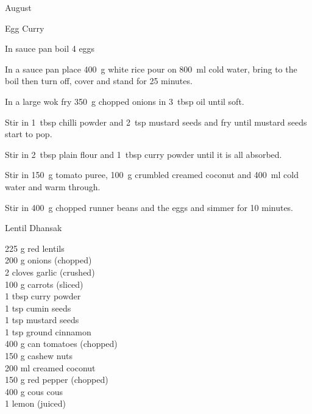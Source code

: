 \begin{menu}{August}
\begin{recipe}{2}{Egg Curry}
    \begin{instructions}
    \item 
        In sauce pan boil
        4  eggs\item 
    In a
    sauce pan
    place
    400~g  white rice
    pour on
    800~ml  cold water,
    bring to the boil then turn off, cover and stand for 25 minutes.
  \item 
        In a large wok fry
        350~g chopped onions
        in
        3~tbsp  oil
        until soft.
      \item 
        Stir in 1~tbsp  chilli powder
        and
        2~tsp  mustard seeds
        and fry until mustard seeds start to pop.
      \item 
        Stir in
        2~tbsp  plain flour
        and
        1~tbsp  curry powder
        until it is all absorbed.
      \item 
        Stir in
        150~g  tomato puree,
        100~g crumbled creamed coconut
        and
        400~ml  cold water
        and warm through.
      \item 
        Stir in
        400~g chopped runner beans
        and the eggs
        and simmer for 10 minutes.
      
    \end{instructions}
    \end{recipe}%
  
    \begin{recipe}{2}{Lentil Dhansak}%
		\begin{ingredients}
		225 g red lentils  \\
	200 g onions (chopped) \\
	2 cloves garlic (crushed) \\
	100 g carrots (sliced) \\
	1 tbsp curry powder  \\
	1 tsp cumin seeds  \\
	1 tsp mustard seeds  \\
	1 tsp ground cinnamon  \\
	400 g can tomatoes (chopped) \\
	150 g cashew nuts  \\
	200 ml creamed coconut  \\
	150 g red pepper (chopped) \\
	400 g cous cous  \\
	1  lemon (juiced) \\
	
		\end{ingredients}
	

\end{recipe}
\end{menu}
